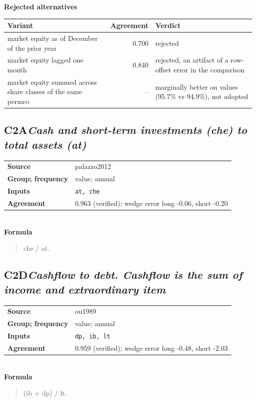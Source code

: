 \documentclass[11pt]{article}
\begin{document}
\textbf{Rejected alternatives}\\[2pt]
{\small\begin{longtable}{@{}p{9.6cm}rp{4.3cm}@{}}
\toprule Variant & Agreement & Verdict\\\midrule\endhead
market equity as of December of the prior year & 0.700 & rejected\\
market equity lagged one month & 0.840 & rejected; an artifact of a row-offset error in the comparison\\
market equity summed across share classes of the same permco & -- & marginally better on values (95.7\% vs 94.9\%), not adopted\\
\bottomrule\end{longtable}}
\subsection*{C2A\quad\normalfont\itshape Cash and short-term investments (che) to total assets (at)}
\begin{tabular}{@{}p{3.3cm}p{12.3cm}@{}}
\textbf{Source} & palazzo2012\\
\textbf{Group; frequency} & value; annual\\
\textbf{Inputs} & \texttt{at, che}\\
\textbf{Agreement} & 0.963 (verified); wedge error long -0.06, short -0.20\\
\end{tabular}\\[4pt]
\textbf{Formula}
\begin{quote}\small
che / at.\\

\end{quote}
\subsection*{C2D\quad\normalfont\itshape Cashflow to debt. Cashflow is the sum of income and extraordinary item}
\begin{tabular}{@{}p{3.3cm}p{12.3cm}@{}}
\textbf{Source} & ou1989\\
\textbf{Group; frequency} & value; annual\\
\textbf{Inputs} & \texttt{dp, ib, lt}\\
\textbf{Agreement} & 0.959 (verified); wedge error long -0.48, short -2.03\\
\end{tabular}\\[4pt]
\textbf{Formula}
\begin{quote}\small
(ib + dp) / lt.\\

\end{quote}
\end{document}

